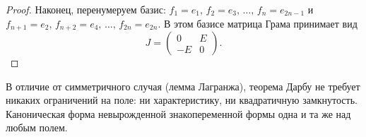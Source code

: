 \begin{theorem}[Дарбу]
\begin{proof}
        Наконец, перенумеруем базис: $f_1 = e_1,\, f_2 = e_3,\,
        \dots,\, f_n = e_{2n-1}$ и $f_{n+1} = e_2,\, f_{n+2} = e_4,\, \dots,\, f_{2n} = e_{2n}$. В этом базисе матрица Грама принимает вид
        \[
            J = \begin{pmatrix} 0 & E \\ -E & 0 \end{pmatrix}.
        \]
    \end{proof}
\end{theorem}


\begin{remark}
    В отличие от симметричного случая (лемма Лагранжа), теорема Дарбу не требует никаких ограничений на поле:
    ни характеристику, ни квадратичную замкнутость. Каноническая форма невырожденной знакопеременной формы одна и та же над любым полем.
\end{remark}
